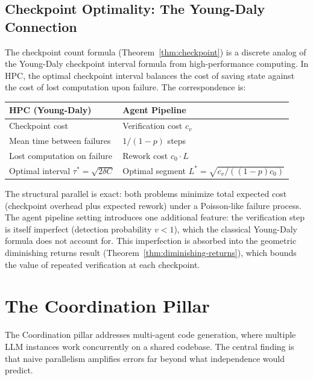 \documentclass[11pt, a4paper]{googledeepmind}
\begin{document}
\subsection{Checkpoint Optimality: The Young-Daly Connection}

The checkpoint count formula (Theorem~\ref{thm:checkpoint}) is a discrete analog of the Young-Daly checkpoint interval formula \citep{young1974first, daly2006higher} from high-performance computing. In HPC, the optimal checkpoint interval balances the cost of saving state against the cost of lost computation upon failure. The correspondence is:

\begin{center}
\small
\begin{tabular}{ll}
\toprule
\textbf{HPC (Young-Daly)} & \textbf{Agent Pipeline} \\
\midrule
Checkpoint cost & Verification cost $c_v$ \\
Mean time between failures & $1/(1-p)$ steps \\
Lost computation on failure & Rework cost $c_0 \cdot L$ \\
Optimal interval $\tau^* = \sqrt{2 \delta C}$ & Optimal segment $L^* = \sqrt{c_v / ((1-p) c_0)}$ \\
\bottomrule
\end{tabular}
\end{center}

The structural parallel is exact: both problems minimize total expected cost (checkpoint overhead plus expected rework) under a Poisson-like failure process. The agent pipeline setting introduces one additional feature: the verification step is itself imperfect (detection probability $v < 1$), which the classical Young-Daly formula does not account for. This imperfection is absorbed into the geometric diminishing returns result (Theorem~\ref{thm:diminishing-returns}), which bounds the value of repeated verification at each checkpoint.
\section{The Coordination Pillar}
\label{sec:coordination}

The Coordination pillar addresses multi-agent code generation, where multiple LLM instances work concurrently on a shared codebase. The central finding is that naive parallelism amplifies errors far beyond what independence would predict.
\end{document}
